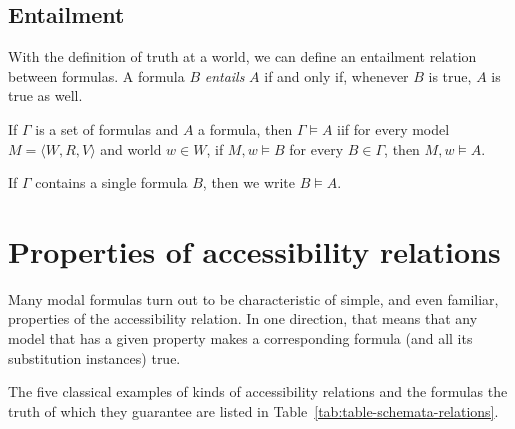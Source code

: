 \subsection{Entailment}
With the definition of truth at a world, we can define an entailment
relation between formulas. A formula $B$ \emph{entails} $A$ if and only if, whenever
$B$ is true, $A$ is true as well.

\begin{definition}
  \label{semantic-entailment}
  If $\Gamma$ is a set of formulas and $A$ a formula, then
  $\Gamma \vDash A$ iif
  for every model $M = \langle W, R, V \rangle$ and world $w \in W$,
  if $M, w \vDash B$ for every $B \in \Gamma$, then $M, w \vDash A$.

  If $\Gamma$ contains a single formula $B$, then we write $B \vDash A$.
\end{definition}


\section{Properties of accessibility relations}

Many modal formulas turn out to be characteristic of simple, and
even familiar, properties of the accessibility relation. In one direction, 
that means that any model that has a given property makes a 
corresponding formula (and all its substitution instances) true. 

The five classical examples of kinds of accessibility 
relations and the formulas the truth of which they guarantee are 
listed in Table~\ref{tab:table-schemata-relations}.

